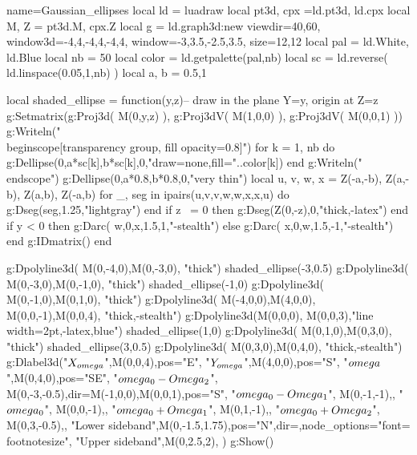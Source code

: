 \documentclass[border=5pt]{standalone}%
\begin{document}
\begin{luadraw}{name=Gaussian_ellipses}
local ld = luadraw
local pt3d, cpx =ld.pt3d, ld.cpx
local M, Z = pt3d.M, cpx.Z
local g = ld.graph3d:new{ viewdir={40,60}, window3d={-4,4,-4,4,-4,4}, window={-3,3.5,-2.5,3.5}, size={12,12} }
local pal = {ld.White, ld.Blue}
local nb = 50
local color = ld.getpalette(pal,nb)
local sc = ld.reverse( ld.linspace(0.05,1,nb) )
local a, b = 0.5,1

local shaded_ellipse = function(y,z)-- draw in the plane Y=y, origin at Z=z
    g:Setmatrix({g:Proj3d( M(0,y,z) ), g:Proj3dV( M(1,0,0) ), g:Proj3dV( M(0,0,1) )})
    g:Writeln("\\begin{scope}[transparency group, fill opacity=0.8]")
    for k = 1, nb do
        g:Dellipse(0,a*sc[k],b*sc[k],0,"draw=none,fill="..color[k])
    end
    g:Writeln("\\end{scope}")
    g:Dellipse(0,a*0.8,b*0.8,0,"very thin")
    local u, v, w, x = Z(-a,-b), Z(a,-b), Z(a,b), Z(-a,b)
    for _, seg in ipairs({{u,v},{v,w},{w,x},{x,u}}) do g:Dseg(seg,1.25,"lightgray") end
    if z ~= 0 then g:Dseg({Z(0,-z),0},"thick,-latex") end
    if y < 0 then g:Darc( w,0,x,1.5,1,"-stealth")
    else g:Darc( x,0,w,1.5,-1,"-stealth")
    end
    g:IDmatrix()
end

g:Dpolyline3d( {M(0,-4,0),M(0,-3,0)}, "thick")
shaded_ellipse(-3,0.5)
g:Dpolyline3d( {M(0,-3,0),M(0,-1,0)}, "thick")
shaded_ellipse(-1,0)
g:Dpolyline3d( {M(0,-1,0),M(0,1,0)}, "thick")
g:Dpolyline3d( {{M(-4,0,0),M(4,0,0)}, {M(0,0,-1),M(0,0,4)}}, "thick,-stealth")
g:Dpolyline3d({M(0,0,0), M(0,0,3)},"line width=2pt,-latex,blue")
shaded_ellipse(1,0)
g:Dpolyline3d( {M(0,1,0),M(0,3,0)}, "thick")
shaded_ellipse(3,0.5)
g:Dpolyline3d( {{M(0,3,0),M(0,4,0)}}, "thick,-stealth")
g:Dlabel3d("$X_{\\omega}$",M(0,0,4),{pos="E"}, "$Y_{\\omega}$",M(4,0,0),{pos="S"},
    "$\\omega$",M(0,4,0),{pos="SE"}, 
    "$\\omega_0-\\Omega_2$", M(0,-3,-0.5),{dir={M(-1,0,0),M(0,0,1)},pos="S"},
    "$\\omega_0-\\Omega_1$", M(0,-1,-1),{},
    "$\\omega_0$", M(0,0,-1),{}, "$\\omega_0+\\Omega_1$", M(0,1,-1),{},
    "$\\omega_0+\\Omega_2$", M(0,3,-0.5),{},
    "Lower sideband",M(0,-1.5,1.75),{pos="N",dir={},node_options="font=\\footnotesize"},
    "Upper sideband",M(0,2.5,2),{}
    )
g:Show()
\end{luadraw}
\end{document}
